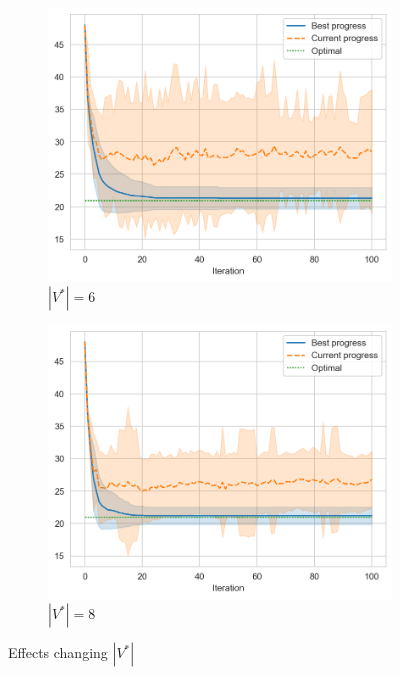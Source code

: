 \begin{figure}[ht]
    \hfill
    \begin{subfigure}{0.45\textwidth}
        \centering
        \includegraphics[width=\textwidth]{../images/p1/added36s.png}
        \caption{\(|V^*| = 6\)}
    \end{subfigure}
    \hfill
    \begin{subfigure}{0.45\textwidth}
        \centering
        \includegraphics[width=\textwidth]{../images/p1/added38s.png}
        \caption{\(|V^*| = 8\)}
    \end{subfigure}
    \hfill

    \caption{Effects changing \(|V^*|\)}
    \label{fig:p1-change-nsize}
\end{figure}

